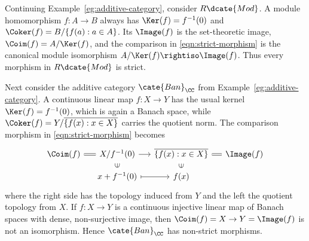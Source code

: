 \begin{example}\label{eg:strict-morphism}
	Continuing Example~\ref{eg:additive-category}, consider $R\dcate{Mod}$. A module homomorphism $f:A\to B$ always has $\Ker(f)=f^{-1}(0)$ and $\Coker(f)=B/\{f(a):a\in A\}$. Its $\Image(f)$ is the set-theoretic image, $\Coim(f)=A/\Ker(f)$, and the comparison in \eqref{eqn:strict-morphism} is the canonical module isomorphism $A/\Ker(f)\rightiso\Image(f)$. Thus every morphism in $R\dcate{Mod}$ is strict.

	Next consider the additive category $\cate{Ban}_{\CC}$ from
	Example~\ref{eg:additive-category}. A continuous linear map $f:X\to Y$ has
	the usual kernel $\Ker(f)=f^{-1}(0)$, which is again a Banach space, while
	$\Coker(f)=Y/\overline{\{f(x):x\in X\}}$ carries the quotient norm. The
	comparison morphism in \eqref{eqn:strict-morphism} becomes
	\[\begin{tikzcd}[row sep=small, column sep=small]
	\Coim(f) \arrow[equal, r] & X/f^{-1}(0) \arrow[r] & \overline{\left\{ f(x): x \in X \right\}} \arrow[equal, r] & \Image(f) \\
	& x + f^{-1}(0) \arrow[mapsto, r] \arrow[phantom, u, "\in" description, sloped] & f(x) \arrow[phantom, u, "\in" description, sloped] &
	\end{tikzcd}\]
	where the right side has the topology induced from $Y$ and the left the quotient topology from $X$. If $f:X\to Y$ is a continuous injective linear map of Banach spaces with dense, non-surjective image, then $\Coim(f)=X\to Y=\Image(f)$ is not an isomorphism. Hence $\cate{Ban}_{\CC}$ has non-strict morphisms.
\end{example}
